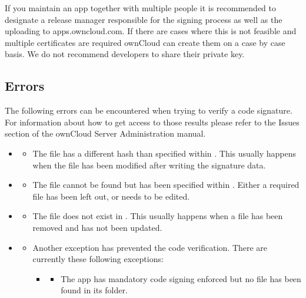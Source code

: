 \documentclass[letterpaper,10pt,english]{sphinxmanual}
\begin{document}
If you maintain an app together with multiple people it is recommended to
designate a release manager responsible for the signing process as well
as the uploading to apps.owncloud.com. If there are cases where this is not
feasible and multiple certificates are required ownCloud can create them on a
case by case basis. We do not recommend developers to share their private key.


\subsection{Errors}
\label{app/code_signing:errors}
The following errors can be encountered when trying to verify a code signature.
For information about how to get access to those results please refer to the
Issues section of the ownCloud Server Administration
manual.
\begin{itemize}
\item {} 
\begin{itemize}
\item {} 
The file has a different hash than specified within . This
usually happens when the file has been modified after writing the signature
data.

\end{itemize}

\item {} 
\begin{itemize}
\item {} 
The file cannot be found but has been specified within .
Either a required file has been left out, or  needs to be
edited.

\end{itemize}

\item {} 
\begin{itemize}
\item {} 
The file does not exist in . This usually happens when a
file has been removed and  has not been updated.

\end{itemize}

\item {} 
\begin{itemize}
\item {} 
Another exception has prevented the code verification. There are currently
these following exceptions:
\begin{itemize}
\item {} 
\begin{itemize}
\item {} 
The app has mandatory code signing enforced but no 
file has been found in its  folder.


\end{itemize}
\end{itemize}
\end{itemize}
\end{itemize}
\end{document}

